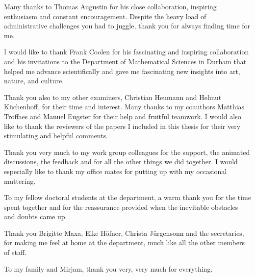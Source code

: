 Many thanks to Thomas Augustin for his close collaboration, inspiring enthusiasm and constant encouragement.
Despite the heavy load of administrative challenges you had to juggle, thank you for always finding time for me. 

I would like to thank Frank Coolen for his fascinating and inspiring collaboration and his invitations
to the Department of Mathematical Sciences in Durham
that helped me advance scientifically and gave me fascinating new insights into art, nature, and culture.

Thank you also to my other examiners, Christian Heumann and Helmut Küchenhoff, for their time and interest.
Many thanks to my coauthors Matthias Troffaes and Manuel Eugster for their help and fruitful teamwork.
I would also like to thank the reviewers of the papers I included in this thesis for their very stimulating and helpful comments.

Thank you very much to my work group colleagues for the support, the animated discussions,
the feedback and for all the other things we did together.
I would especially like to thank my office mates for putting up with my occasional muttering.

To my fellow doctoral students at the department,
a warm thank you for the time spent together and for the reassurance provided when the inevitable obstacles and doubts came up.

Thank you Brigitte Maxa, Elke Höfner, Christa Jürgensonn and the secretaries,
for making me feel at home at the department, much like all the other members of staff.

To my family and Mirjam, thank you very, very much for everything.   


